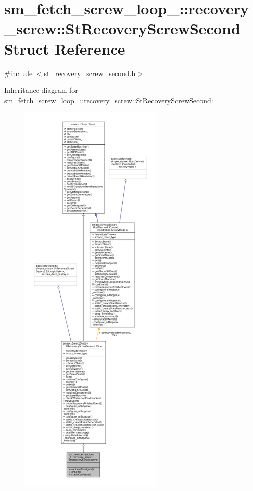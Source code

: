 \hypertarget{structsm__fetch__screw__loop__1_1_1recovery__screw_1_1StRecoveryScrewSecond}{}\section{sm\+\_\+fetch\+\_\+screw\+\_\+loop\+\_\+:\+:recovery\+\_\+screw\+:\+:St\+Recovery\+Screw\+Second Struct Reference}
\label{structsm__fetch__screw__loop__1_1_1recovery__screw_1_1StRecoveryScrewSecond}


{\ttfamily \#include $<$st\+\_\+recovery\+\_\+screw\+\_\+second.\+h$>$}



Inheritance diagram for sm\+\_\+fetch\+\_\+screw\+\_\+loop\+\_\+:\+:recovery\+\_\+screw\+:\+:St\+Recovery\+Screw\+Second\+:
\nopagebreak
\begin{figure}[H]
\begin{center}
\leavevmode
\includegraphics[height=550pt]{structsm__fetch__screw__loop__1_1_1recovery__screw_1_1StRecoveryScrewSecond__inherit__graph}
\end{center}
\end{figure}


